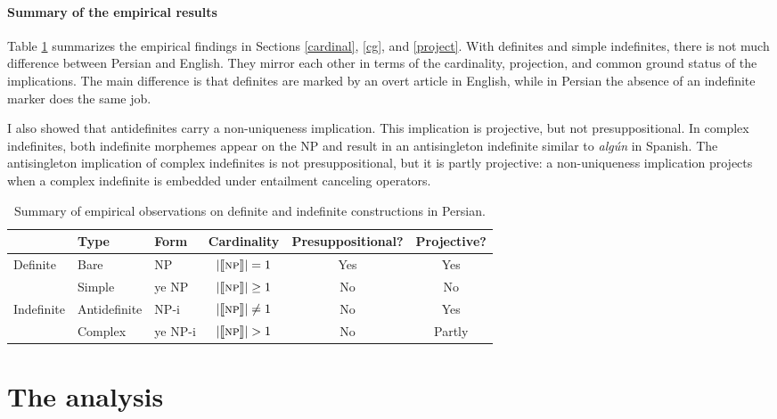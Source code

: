 \documentclass{salt}
\begin{document}
\paragraph {Summary of the empirical results} Table \ref{sum} summarizes the empirical findings in Sections \ref{cardinal}, \ref{cg}, and \ref{project}. With definites and simple indefinites, there is not much difference between Persian and English. They mirror each other in terms of the cardinality, projection, and common ground status of the implications. The main difference is that definites are marked by an overt article in English, while in Persian the absence of an indefinite marker does the same job. 

I also showed that antidefinites carry a non-uniqueness implication. This implication is projective, but not presuppositional. In complex indefinites, both indefinite morphemes appear on the NP and result in an antisingleton indefinite similar to \emph{alg\'{u}n} in Spanish. The antisingleton implication of complex indefinites is not presuppositional, but it is partly projective: a non-uniqueness implication projects when a complex indefinite is embedded under entailment canceling operators. 

\begin {table}
\centering
{\small
\begin {tabular} {l | l | l | c | c | c}
 & Type & Form & Cardinality & Presuppositional? & Projective? \\ \hline
Definite & Bare & \hspace{0.43cm} {\small NP} &  $| \llbracket \textsc{np} \rrbracket | = 1$ & Yes & Yes \\ \hdashline
 & Simple & {\color {red}ye} {\small NP} & $| \llbracket \textsc{np} \rrbracket | \geq 1$ & No & No \\
Indefinite & Antidefinite & \hspace{0.43cm} \small{NP}-{\color {blue}i} & $| \llbracket \textsc{np} \rrbracket | \not = 1$ & No & Yes \\
 & Complex & {\color {red}ye} {\small NP}-{\color {blue}i} & $| \llbracket \textsc{np} \rrbracket | > 1$ & No & Partly  \\
\end {tabular}
}
\caption {{\footnotesize Summary of empirical observations on definite and indefinite constructions in Persian.}}
\label{sum}
\end {table}

\section {The analysis} \label{anal}
\end{document}

